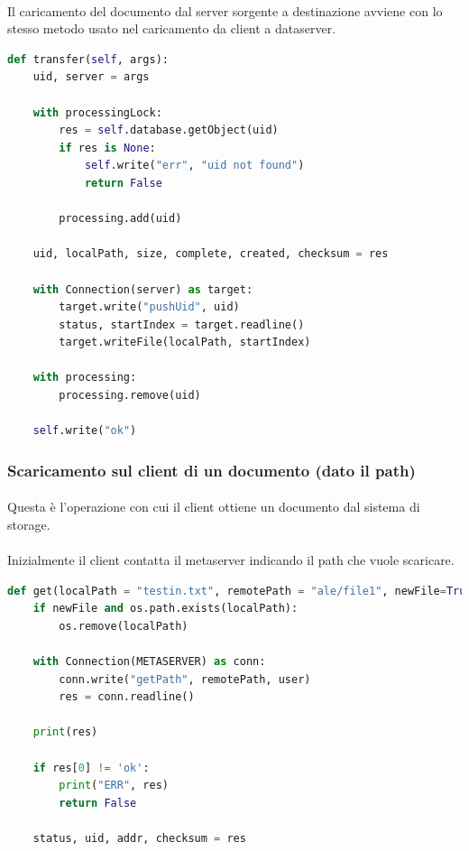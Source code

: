 \documentclass[11pt,a4paper,english]{article}
\begin{document}
\paragraph{} Il caricamento del documento dal server sorgente a destinazione avviene con lo stesso metodo usato nel caricamento da client a dataserver.

\begin{lstlisting}[language=Python, title=Dataserver sorgente]
def transfer(self, args):
    uid, server = args

    with processingLock:
        res = self.database.getObject(uid)
        if res is None:
            self.write("err", "uid not found")
            return False

        processing.add(uid)

    uid, localPath, size, complete, created, checksum = res

    with Connection(server) as target:
        target.write("pushUid", uid)
        status, startIndex = target.readline()
        target.writeFile(localPath, startIndex)

    with processing:
        processing.remove(uid)

    self.write("ok")
\end{lstlisting}



\subsubsection{Scaricamento sul client di un documento (dato il path)}

\paragraph{} Questa è l'operazione con cui il client ottiene un documento dal sistema di storage.

\paragraph{} Inizialmente il client contatta il metaserver indicando il path che vuole scaricare.

\begin{lstlisting}[language=Python, title=Client]
def get(localPath = "testin.txt", remotePath = "ale/file1", newFile=True, user="default"):
    if newFile and os.path.exists(localPath):
        os.remove(localPath)

    with Connection(METASERVER) as conn:
        conn.write("getPath", remotePath, user)
        res = conn.readline()

    print(res)

    if res[0] != 'ok':
        print("ERR", res)
        return False

    status, uid, addr, checksum = res
\end{lstlisting}
\end{document}
